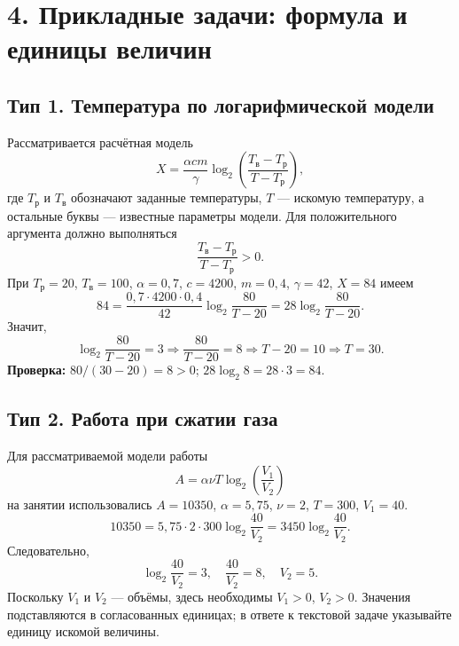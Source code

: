 \documentclass[a4paper,12pt]{article}
\newcommand{\key}[1]{\textcolor{darkaccent}{\textbf{#1}}}
\begin{document}
\clearpage
\section*{4. Прикладные задачи: формула и единицы величин}
\subsection*{Тип 1. Температура по логарифмической модели}
Рассматривается расчётная модель
\[
X=\frac{\alpha c m}{\gamma}\log_2\!\left(\frac{T_{\mathrm{в}}-T_{\mathrm{р}}}{T-T_{\mathrm{р}}}\right),
\]
где $T_{\mathrm{р}}$ и $T_{\mathrm{в}}$ обозначают заданные температуры, $T$ --- искомую температуру, а остальные буквы --- известные параметры модели. Для положительного аргумента должно выполняться
\[
\frac{T_{\mathrm{в}}-T_{\mathrm{р}}}{T-T_{\mathrm{р}}}>0.
\]
При $T_{\mathrm{р}}=20$, $T_{\mathrm{в}}=100$, $\alpha=0{,}7$, $c=4200$, $m=0{,}4$, $\gamma=42$, $X=84$ имеем
\[
84=\frac{0{,}7\cdot4200\cdot0{,}4}{42}\log_2\frac{80}{T-20}
=28\log_2\frac{80}{T-20}.
\]
Значит,
\[
\log_2\frac{80}{T-20}=3\Longrightarrow\frac{80}{T-20}=8
\Longrightarrow T-20=10\Longrightarrow\boxed{T=30}.
\]
\key{Проверка:} $80/(30-20)=8>0$; $28\log_2 8=28\cdot3=84$.

\subsection*{Тип 2. Работа при сжатии газа}
Для рассматриваемой модели работы
\[
A=\alpha\nu T\log_2\!\left(\frac{V_1}{V_2}\right)
\]
на занятии использовались $A=10350$, $\alpha=5{,}75$, $\nu=2$, $T=300$, $V_1=40$.
\[
10350=5{,}75\cdot2\cdot300\log_2\frac{40}{V_2}
=3450\log_2\frac{40}{V_2}.
\]
Следовательно,
\[
\log_2\frac{40}{V_2}=3,\quad\frac{40}{V_2}=8,\quad
\boxed{V_2=5}.
\]
Поскольку $V_1$ и $V_2$ --- объёмы, здесь необходимы $V_1>0$, $V_2>0$. Значения подставляются в согласованных единицах; в ответе к текстовой задаче указывайте единицу искомой величины.

\clearpage
\end{document}
